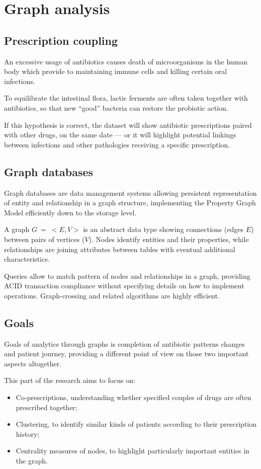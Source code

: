 \chapter{Graph analysis}
\section{Prescription coupling}
An excessive usage of antibiotics causes death of microorganisms in the human body which provide to maintaining immune cells and killing certain oral infections\cite{bacteria}.

To equilibrate the intestinal flora, lactic ferments are often taken together with antibiotics, so that new ``good'' bacteria can restore the probiotic action.

If this hypothesis is correct, the dataset will show antibiotic prescriptions paired with other drugs, on the same date --- or it will highlight potential linkings between infections and other pathologies receiving a specific prescription.

\section{Graph databases}
Graph databases are data management systems allowing persistent representation of entity and relationship in a graph structure, implementing the Property Graph Model efficiently down to the storage level. %

A graph $G\: =\: <E, V>$ is an abstract data type showing connections (edges $E$) between pairs of vertices ($V$). Nodes identify entities and their properties, while relationships are joining attributes between tables with eventual additional characteristics. 

Queries allow to match pattern of nodes and relationships in a graph, providing ACID transaction compliance without specifying details on how to implement operations. Graph-crossing and related algorithms are highly efficient.

\section{Goals}
Goals of analytics through graphs is completion of antibiotic patterns changes and patient journey, providing a different point of view on those two important aspects altogether.

This part of the research aims to focus on:
\begin{itemize}
	\item Co-prescriptions, understanding whether specified couples of drugs are often prescribed together;
	\item Clustering, to identify similar kinds of patients according to their prescription history;
	\item Centrality measures of nodes, to highlight particularly important entities in the graph.
\end{itemize}

